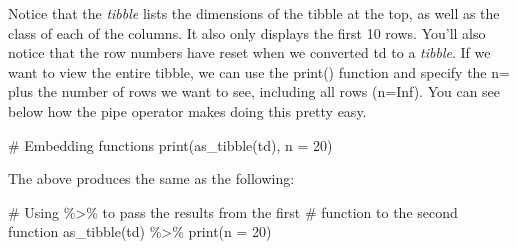 \documentclass[
  12pt,
  letterpaper]{article}
\newenvironment{Shaded}{\begin{snugshade}}{\end{snugshade}}
\newcommand{\AttributeTok}[1]{\textcolor[rgb]{0.40,0.45,0.13}{#1}}
\newcommand{\CommentTok}[1]{\textcolor[rgb]{0.37,0.37,0.37}{#1}}
\newcommand{\DecValTok}[1]{\textcolor[rgb]{0.68,0.00,0.00}{#1}}
\newcommand{\FunctionTok}[1]{\textcolor[rgb]{0.28,0.35,0.67}{#1}}
\newcommand{\NormalTok}[1]{\textcolor[rgb]{0.00,0.23,0.31}{#1}}
\newcommand{\SpecialCharTok}[1]{\textcolor[rgb]{0.37,0.37,0.37}{#1}}
\renewcommand\texttt[1]{{\ttfamily\color{BrickRed}#1}}
\begin{document}
Notice that the \emph{tibble} lists the dimensions of the tibble at the
top, as well as the class of each of the columns. It also only displays
the first 10 rows. You'll also notice that the row numbers have reset
when we converted \texttt{td} to a \emph{tibble}. If we want to view the
entire tibble, we can use the \texttt{print()} function and specify the
\texttt{n=} plus the number of rows we want to see, including all rows
(\texttt{n=Inf}). You can see below how the pipe operator makes doing
this pretty easy.

\begin{Shaded}
\begin{Highlighting}[]
\CommentTok{\# Embedding functions}
\FunctionTok{print}\NormalTok{(}\FunctionTok{as\_tibble}\NormalTok{(td), }\AttributeTok{n =} \DecValTok{20}\NormalTok{)}
\end{Highlighting}
\end{Shaded}

The above produces the same as the following:

\begin{Shaded}
\begin{Highlighting}[]
\CommentTok{\# Using \%\textgreater{}\% to pass the results from the first}
\CommentTok{\# function to the second function}
\FunctionTok{as\_tibble}\NormalTok{(td) }\SpecialCharTok{\%\textgreater{}\%}
    \FunctionTok{print}\NormalTok{(}\AttributeTok{n =} \DecValTok{20}\NormalTok{)}
\end{Highlighting}
\end{Shaded}
\end{document}
